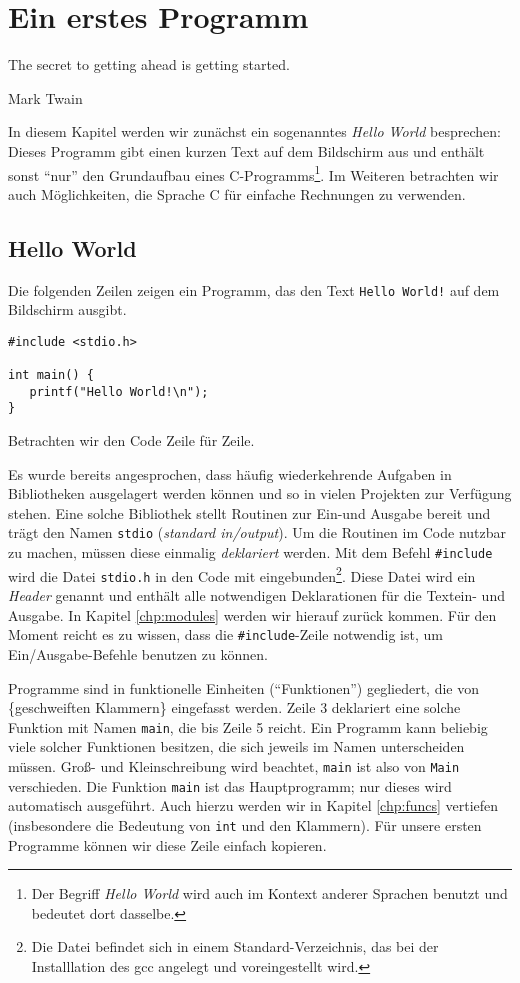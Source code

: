 \chapter{Ein erstes Programm}
\epigraph{The secret to getting ahead is getting started.}{Mark Twain}
In diesem Kapitel werden wir zunächst ein sogenanntes \emph{Hello World} besprechen: Dieses Programm gibt einen kurzen Text auf dem Bildschirm aus und enthält sonst \enquote{nur} den Grundaufbau eines C-Programms\footnote{Der Begriff \emph{Hello World} wird auch im Kontext anderer Sprachen benutzt und bedeutet dort dasselbe.}. Im Weiteren betrachten wir auch Möglichkeiten, die Sprache C für einfache Rechnungen zu verwenden.

\section{Hello World}
Die folgenden Zeilen zeigen ein Programm, das den Text \texttt{Hello World!} auf dem Bildschirm ausgibt.
\begin{codebox}
\begin{verbatim}
#include <stdio.h>

int main() {
   printf("Hello World!\n");
}
\end{verbatim}
\end{codebox}
Betrachten wir den Code Zeile für Zeile.

Es wurde bereits angesprochen, dass häufig wiederkehrende Aufgaben in Bibliotheken ausgelagert werden können und so in vielen Projekten zur Verfügung stehen. Eine solche Bibliothek stellt Routinen zur Ein-und Ausgabe bereit und trägt den Namen \texttt{stdio} (\emph{standard in/output}). Um die Routinen im Code nutzbar zu machen, müssen diese einmalig \emph{deklariert} werden. Mit dem Befehl \texttt{#include} wird die Datei \texttt{stdio.h} in den Code mit eingebunden\footnote{Die Datei befindet sich in einem Standard-Verzeichnis, das bei der Installlation des gcc angelegt und voreingestellt wird.}. Diese Datei wird ein \emph{Header} genannt und enthält alle notwendigen Deklarationen für die Textein- und Ausgabe. In Kapitel \ref{chp:modules} werden wir hierauf zurück kommen. Für den Moment reicht es zu wissen, dass die \texttt{#include}-Zeile notwendig ist, um Ein/Ausgabe-Befehle benutzen zu können.

Programme sind in funktionelle Einheiten (\enquote{Funktionen}) gegliedert, die von \{geschweiften Klammern\} eingefasst werden. Zeile 3 deklariert eine solche Funktion mit Namen \texttt{main}, die bis Zeile 5 reicht. Ein Programm kann beliebig viele solcher Funktionen besitzen, die sich jeweils im Namen unterscheiden müssen. Groß- und Kleinschreibung wird beachtet, \texttt{main} ist also von \texttt{Main} verschieden. Die Funktion \texttt{main} ist das Hauptprogramm; nur dieses wird automatisch ausgeführt. Auch hierzu werden wir in Kapitel \ref{chp:funcs} vertiefen (insbesondere die Bedeutung von \texttt{int} und den Klammern). Für unsere ersten Programme können wir diese Zeile einfach kopieren.

